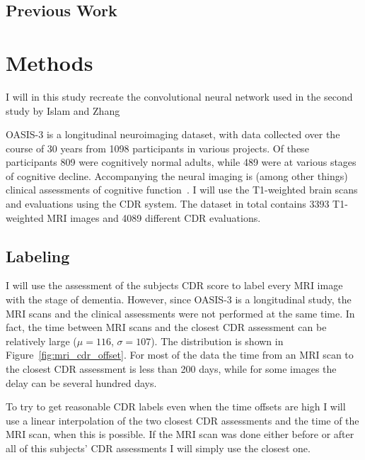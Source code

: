 \documentclass{kththesis}
\begin{document}
\section{Previous Work}

\chapter{Methods}

I will in this study recreate the convolutional neural network used in the second study by Islam and Zhang

OASIS-3 is a longitudinal neuroimaging dataset, with data collected over the course of 30 years from 1098 participants in various projects. Of these participants 809 were cognitively normal adults, while 489 were at various stages of cognitive decline. Accompanying the neural imaging is (among other things) clinical assessments of cognitive function~\cite{oasis3}. I will use the T1-weighted brain scans and evaluations using the CDR system. The dataset in total contains 3393 T1-weighted MRI images and 4089 different CDR evaluations.

\section{Labeling}
I will use the assessment of the subjects CDR score to label every MRI image with the stage of dementia. However, since OASIS-3 is a longitudinal study, the MRI scans and the clinical assessments were not performed at the same time. In fact, the time between MRI scans and the closest CDR assessment can be relatively large ($\mu=116$, $\sigma=107$). The distribution is shown in Figure~\ref{fig:mri_cdr_offset}. For most of the data the time from an MRI scan to the closest CDR assessment is less than 200 days, while for some images the delay can be several hundred days.

To try to get reasonable CDR labels even when the time offsets are high I will use a linear interpolation of the two closest CDR assessments and the time of the MRI scan, when this is possible. If the MRI scan was done either before or after all of this subjects' CDR assessments I will simply use the closest one.
\end{document}

